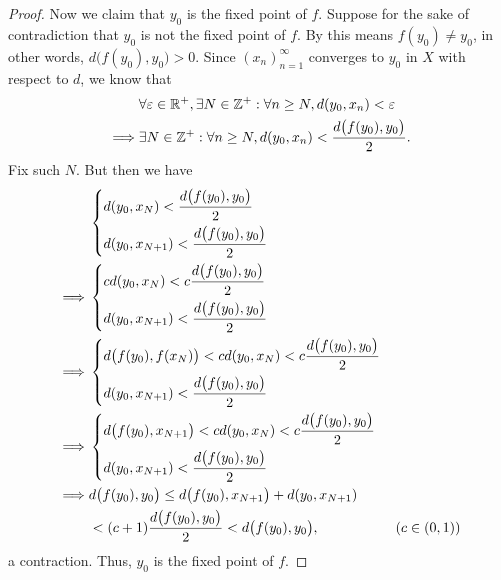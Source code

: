 \begin{proof}
  Now we claim that \(y_0\) is the fixed point of \(f\).
  Suppose for the sake of contradiction that \(y_0\) is not the fixed point of \(f\).
  By  this means \(f(y_0) \neq y_0\), in other words, \(d\big(f(y_0), y_0\big) > 0\).
  Since \((x_n)_{n = 1}^\infty\) converges to \(y_0\) in \(X\) with respect to \(d\), we know that
  \begin{align*}
             & \forall \varepsilon \in \mathbb{R}^+, \exists N \in \mathbb{Z}^+ : \forall n \geq N, d(y_0, x_n) < \varepsilon \\
    \implies & \exists N \in \mathbb{Z}^+ : \forall n \geq N, d(y_0, x_n) < \dfrac{d\big(f(y_0), y_0\big)}{2}.
  \end{align*}
  Fix such \(N\).
  But then we have
  \begin{align*}
             & \begin{dcases}
                 d(y_0, x_N) < \dfrac{d\big(f(y_0), y_0\big)}{2} \\
                 d(y_0, x_{N + 1}) < \dfrac{d\big(f(y_0), y_0\big)}{2}
               \end{dcases}                                                   \\
    \implies & \begin{dcases}
                 c d(y_0, x_N) < c \dfrac{d\big(f(y_0), y_0\big)}{2} \\
                 d(y_0, x_{N + 1}) < \dfrac{d\big(f(y_0), y_0\big)}{2}
               \end{dcases}                                                   \\
    \implies & \begin{dcases}
                 d\big(f(y_0), f(x_N)\big) < c d(y_0, x_N) < c \dfrac{d\big(f(y_0), y_0\big)}{2} \\
                 d(y_0, x_{N + 1}) < \dfrac{d\big(f(y_0), y_0\big)}{2}
               \end{dcases}                        \\
    \implies & \begin{dcases}
                 d\big(f(y_0), x_{N + 1}\big) < c d(y_0, x_N) < c \dfrac{d\big(f(y_0), y_0\big)}{2} \\
                 d(y_0, x_{N + 1}) < \dfrac{d\big(f(y_0), y_0\big)}{2}
               \end{dcases}                     \\
    \implies & d\big(f(y_0), y_0\big) \leq d\big(f(y_0), x_{N + 1}\big) + d(y_0, x_{N + 1})                           \\
             & < (c + 1) \dfrac{d\big(f(y_0), y_0\big)}{2} < d\big(f(y_0), y_0\big),                 & (c \in (0, 1))
  \end{align*}
  a contraction.
  Thus, \(y_0\) is the fixed point of \(f\).
\end{proof}


